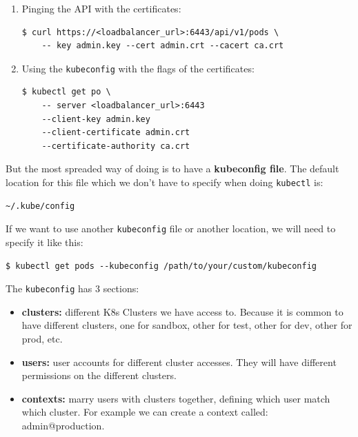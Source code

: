 \documentclass{article}
\newenvironment{codetemplate}[1][]{%
  \mybasecolorbox[#1]
  \itshape
}{%
  \endmybasecolorbox
}
\begin{document}
\begin{enumerate}
    \item Pinging the API with the certificates:
\begin{codetemplate}{}
\begin{verbatim}
$ curl https://<loadbalancer_url>:6443/api/v1/pods \
    -- key admin.key --cert admin.crt --cacert ca.crt
\end{verbatim}
\end{codetemplate}
    \item Using the \verb|kubeconfig| with the flags of the certificates:
\begin{codetemplate}{}
\begin{verbatim}
$ kubectl get po \
    -- server <loadbalancer_url>:6443
    --client-key admin.key
    --client-certificate admin.crt
    --certificate-authority ca.crt
\end{verbatim}
\end{codetemplate}
\end{enumerate}

But the most spreaded way of doing is to have a \textbf{kubeconfig file}. The default location for this file which we don't have to specify when doing \verb|kubectl| is:
\begin{codetemplate}{}
\begin{verbatim}
~/.kube/config
\end{verbatim}
\end{codetemplate}

If we want to use another \verb|kubeconfig| file or another location, we will need to specify it like this:
\begin{codetemplate}{}
\begin{verbatim}
$ kubectl get pods --kubeconfig /path/to/your/custom/kubeconfig
\end{verbatim}
\end{codetemplate}

The \verb|kubeconfig| has 3 sections:
\begin{itemize}
    \item \textbf{clusters:} different K8s Clusters we have access to. Because it is common to have different clusters, one for sandbox, other for test, other for dev, other for prod, etc.
    \item \textbf{users:} user accounts for different cluster accesses. They will have different permissions on the different clusters.
    \item \textbf{contexts:} marry users with clusters together, defining which user match which cluster. For example we can create a context called: admin@production.
\end{itemize}
\end{document}
